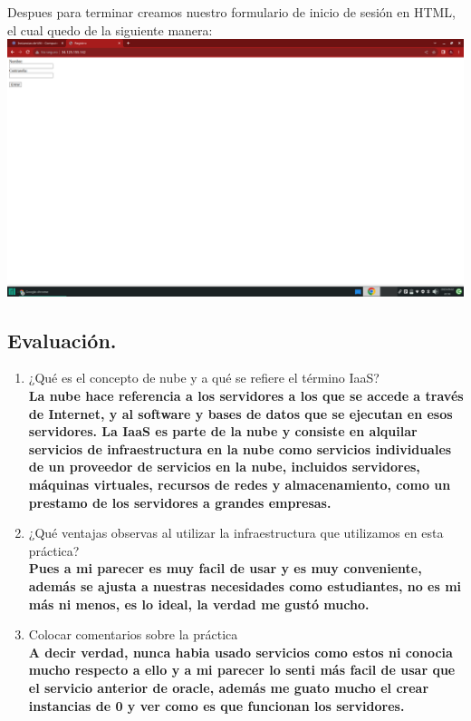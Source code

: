 \documentclass[12pt]{article}
\begin{document}
Despues para terminar creamos nuestro formulario de inicio de sesión en HTML, el cual quedo de la siguiente manera:\\
\textbf{\includegraphics[scale = 0.25]{images/Formulario.png}}\\

{\color{blue} \subsection*{\textbf{Evaluación.}}}
\vspace{1em}
\begin{enumerate}
    \item ¿Qué es el concepto de nube y a qué se refiere el término IaaS?\\
    \textbf{La nube hace referencia a los servidores a los que se accede a través de Internet, y al software y bases de datos que se ejecutan en esos servidores.
    La IaaS es parte de la nube y consiste en alquilar servicios de infraestructura en la nube como servicios individuales de un proveedor de servicios en la nube, incluidos servidores, máquinas virtuales, recursos de redes y almacenamiento, como un prestamo de los servidores a grandes empresas. }
    \item ¿Qué ventajas observas al utilizar la infraestructura que utilizamos en esta práctica?\\
    \textbf{Pues a mi parecer es muy facil de usar y es muy conveniente, además se ajusta a nuestras necesidades como estudiantes, no es mi más ni menos, es lo ideal, la verdad me gustó mucho.}
    \item Colocar comentarios sobre la práctica\\
    \textbf{A decir verdad, nunca habia usado servicios como estos ni conocia mucho respecto a ello y a mi parecer lo senti más facil de usar que el servicio anterior de oracle, además me guato mucho el crear instancias de 0 y ver como es que funcionan los servidores.}
\end{enumerate}
\end{document}
